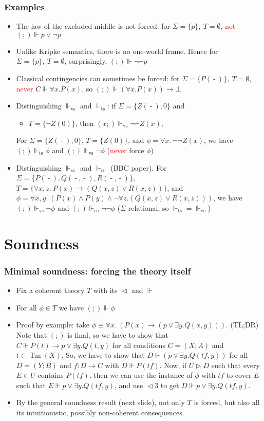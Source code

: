 \documentclass[handout,11pt]{beamer}
\newcommand{\red}[1]{\textcolor{red}{#1}}
\newcommand{\set}[1]{\{#1\}}
\newcommand{\es}{\emptyset}
\newcommand{\covd}{\mathrel{\vartriangleleft}}
\newcommand{\covs}{\mathrel{\vartriangleright}}
\newcommand*{\subvs}{_{\mathrm{vs}}}
\newcommand*{\subrn}{_{\mathrm{rn}}}
\newcommand*{\subts}{_{\mathrm{ts}}}
\newcommand{\Fts}{\Vdash\subts}
\newcommand{\Fvs}{\Vdash\subvs}
\newcommand{\Frn}{\Vdash\subrn}
\newcommand{\blank}{\mathord{\operatorname{-}}} %
\DeclareMathOperator{\Tm}{Tm}
\begin{document}
\begin{frame}
\frametitle{Examples}
 \begin{itemize}[<+->]
    \item The law of the excluded middle is not forced:
    for $\Sigma=\set{p},~T=\es$, \red{not} $(;)\Vdash p\lor\neg p$
    \item Unlike Kripke semantics, there is no one-world frame. Hence
    for $\Sigma=\set{p},~T=\es$, surprisingly, $(;)\Vdash \neg\neg p$
    \item Classical contingencies can sometimes be forced:
    for $\Sigma=\set{P(\blank)},~T=\es$, \red{never} $C\Vdash \forall x. P(x)$,
    so $(;)\Vdash (\forall x. P(x))\to\bot$
    \item Distinguishing $\Fvs$ and $\Fts$: if $\Sigma=\set{Z(\blank),0}$ and
    \begin{itemize}[<+->]
     \item $T=\set{\neg Z(0)}$, then $(x;)\Fvs\neg\neg Z(x)$, 
    \end{itemize}
    For $\Sigma=\set{Z(\blank),0}$, $T=\set{Z(0)}$, and
    $\phi= \forall x.~\neg\neg Z(x)$,
    we have $(;)\Fts \phi$ and $(;)\Fvs\neg\phi$ 
    (\red{never} force $\phi$)
    \item Distinguishing $\Fvs$ and $\Frn$ (BBC paper).
    For $\Sigma=\set{P(\blank),Q(\blank,\blank),R(\blank,\blank)}$, 
    $T=\set{\forall x,z.~P(x)\to(Q(x,z)\lor R(x,z))}$, and
    $\phi= \forall x,y.~(P(x)\land P(y)\land\neg\forall z.(Q(x,z)\lor R(x,z)))$,
    we have $(;)\Fvs \neg\phi$ and $(;)\Frn \neg\neg\phi$ 
    ($\Sigma$ relational, so $\Fts=\Fvs$)
 \end{itemize}
\end{frame}

\section{Soundness}

\begin{frame}
\frametitle{Minimal soundness: forcing the theory itself}
\begin{itemize}[<+->]
 \item Fix a coherent theory $T$ with its $\covd$ and $\Vdash$    
 \item For all $\phi\in T$ we have $(;)\Vdash\phi$
 \item Proof by example: take
 $\phi\equiv\forall x.~(P(x)\to (p\lor \exists y. Q(x,y)))$.
 (TL;DR) Note that $(;)$ is final, so we have to show that 
 $C\Vdash P(t)\to p\lor \exists y. Q(t,y)$ for all
 conditions $C=(X;A)$ and $t\in\Tm(X)$. So, we have to show
 that $D\Vdash (p\lor \exists y. Q(tf,y))$ for all $D=(Y;B)$
 and $f:D\to C$ with $D\Vdash P(tf)$. Now, if $U\covs D$ such 
 that every $E\in U$ contains $P(tf)$, then we can use
 the instance of $\phi$ with $tf$ to cover $E$
 such that $E\Vdash p\lor \exists y. Q(tf,y)$,
 and use ${\covd}3$ to get $D\Vdash p\lor \exists y. Q(tf,y)$.
 \item By the general soundness result (next slide),
 not only $T$ is forced, but also all its intuitionistic,
 possibly non-coherent consequences.
 \end{itemize}
\end{frame}
\end{document}
